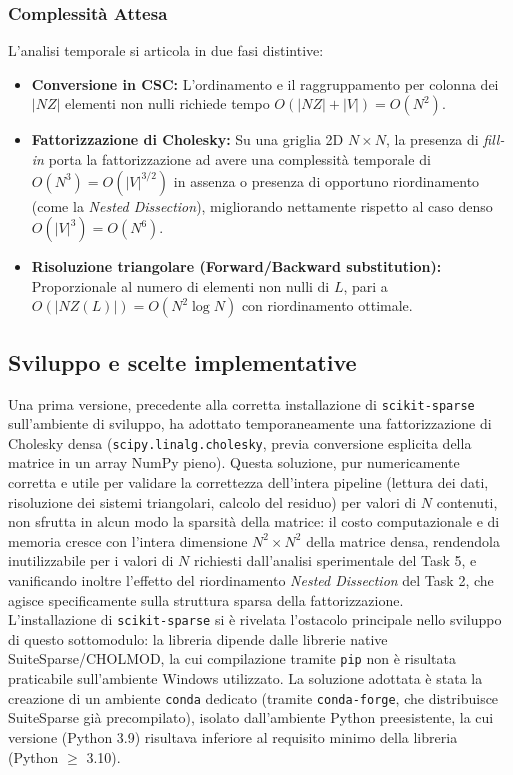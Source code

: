 \documentclass[twocolumn]{article}
\begin{document}
\subsubsection{Complessit\`a Attesa}
L'analisi temporale si articola in due fasi distintive:
\begin{itemize}
    \item \textbf{Conversione in CSC:} L'ordinamento e il raggruppamento per colonna dei $|NZ|$ elementi non nulli richiede tempo $O(|NZ| + |V|) = O(N^2)$.
    \item \textbf{Fattorizzazione di Cholesky:} Su una griglia 2D $N \times N$, la presenza di \textit{fill-in} porta la fattorizzazione ad avere una complessit\`a temporale di $O(N^3) = O(|V|^{3/2})$ in assenza o presenza di opportuno riordinamento (come la \textit{Nested Dissection}), migliorando nettamente rispetto al caso denso $O(|V|^3) = O(N^6)$.
    \item \textbf{Risoluzione triangolare (Forward/Backward substitution):} Proporzionale al numero di elementi non nulli di $L$, pari a $O(|NZ(L)|) = O(N^2 \log N)$ con riordinamento ottimale.
\end{itemize}


\subsection{Sviluppo e scelte implementative}
Una prima versione, precedente alla corretta installazione di
\texttt{scikit-sparse} sull'ambiente di sviluppo, ha adottato temporaneamente
una fattorizzazione di Cholesky densa (\texttt{scipy.linalg.cholesky}, previa
conversione esplicita della matrice in un array NumPy pieno). Questa
soluzione, pur numericamente corretta e utile per validare la correttezza
dell'intera pipeline (lettura dei dati, risoluzione dei sistemi triangolari,
calcolo del residuo) per valori di $N$ contenuti, non sfrutta in alcun modo la
sparsità della matrice: il costo computazionale e di memoria cresce con
l'intera dimensione $N^2 \times N^2$ della matrice densa, rendendola
inutilizzabile per i valori di $N$ richiesti dall'analisi sperimentale del
Task 5, e vanificando inoltre l'effetto del riordinamento \textit{Nested Dissection} del Task 2, che agisce specificamente sulla struttura sparsa
della fattorizzazione.\\

L'installazione di \texttt{scikit-sparse} si è rivelata l'ostacolo principale
nello sviluppo di questo sottomodulo: la libreria dipende dalle librerie
native SuiteSparse/CHOLMOD, la cui compilazione tramite \texttt{pip} non è
risultata praticabile sull'ambiente Windows utilizzato. La soluzione adottata
è stata la creazione di un ambiente \texttt{conda} dedicato (tramite
\texttt{conda-forge}, che distribuisce SuiteSparse già precompilato), isolato
dall'ambiente Python preesistente, la cui versione (Python 3.9) risultava
inferiore al requisito minimo della libreria (Python $\geq$ 3.10).\\
\end{document}
